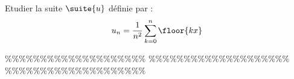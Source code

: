 


\begin{exercice}
Etudier  la suite $\suite{u}$ définie par : 
$$u_n = \frac{1}{n^2}\sum_{k=0}^n \floor{kx}$$
\end{exercice}


\%\%\%\%\%\%\%\%\%\%\%\%\%\%\%\%\%\%\%\%
\%\%\%\%\%\%\%\%\%\%\%\%\%\%\%\%\%\%\%\%
\%\%\%\%\%\%\%\%\%\%\%\%\%\%\%\%\%\%\%\%




\begin{correction}   \;
%
%
\end{correction}